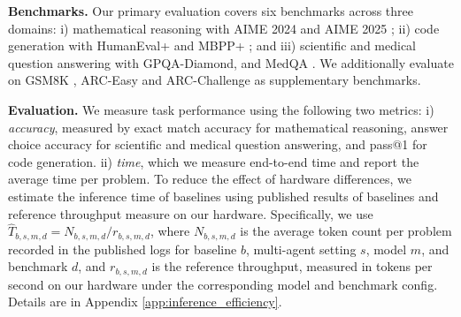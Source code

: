 \documentclass[11pt]{article}
\begin{document}

\noindent\textbf{Benchmarks.} Our primary evaluation covers six benchmarks across three
domains: i) mathematical reasoning with AIME 2024 and AIME 2025 \citep{aime2024,aime2025}; ii) code generation with HumanEval+ and MBPP+ \citep{evalplus}; and iii) scientific and medical question answering with  GPQA-Diamond, and MedQA \citep{gpqa,medqa}. 
We additionally evaluate on GSM8K \citep{gsm8k}, ARC-Easy and ARC-Challenge \citep{arc} as supplementary benchmarks.

\noindent\textbf{Evaluation.} We measure task performance using the following two metrics: i) \textit{accuracy}, measured by exact match accuracy for mathematical reasoning, answer choice accuracy for scientific and medical question answering, and pass@1 for code generation. 
ii) \textit{time}, which we measure end-to-end time and report the average time per problem. 
To reduce the effect of hardware differences, we estimate the inference time of baselines using published results of baselines and reference throughput measure on our hardware.
Specifically, we use $\widehat{T}_{b,s,m,d} = N_{b,s,m,d}/r_{b,s,m,d}$, where $N_{b,s,m,d}$ is the average token count per problem recorded in the published logs for baseline $b$, multi-agent setting $s$, model $m$, and benchmark $d$, and $r_{b,s,m,d}$ is the reference throughput, measured in tokens per second on our hardware under the corresponding model and benchmark config. Details are in Appendix \ref{app:inference_efficiency}.
\end{document}
